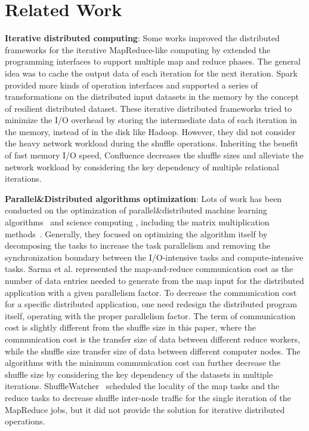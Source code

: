 \documentclass[10pt,journal,compsoc]{IEEEtran}
\begin{document}
\section{Related Work}\label{section:relatedWork}
\textbf{Iterative distributed computing}: 
Some works \cite{gunarathne2013scalable, bu2010haloop, ekanayake2010twister} improved the distributed frameworks for the iterative MapReduce-like computing by extended the programming interfaces to support multiple map and reduce phases. 
The general idea was to cache the output data of each iteration for the next iteration. 
Spark \cite{zaharia2012resilient} provided more kinds of operation interfaces and supported a series of transformations on the distributed input datasets in the memory by the concept of resilient distributed dataset. 
These iterative distributed frameworks tried to minimize the I/O overhead by storing the intermediate data of each iteration in the memory, instead of in the disk like Hadoop. 
However, they did not consider the heavy network workload during the shuffle operations. 
Inheriting the benefit of fast memory I/O speed, Confluence decreases the shuffle sizes and alleviate the network workload by considering the key dependency of multiple relational iterations. 

\textbf{Parallel\&Distributed algorithms optimization}: Lots of work has been conducted on the optimization of parallel\&distributed machine learning algorithms~\cite{bekkerman2011scaling} and science computing \cite{kiran2013verification, mensink2012metric}, including the matrix multiplication methods~\cite{buluc2012parallel, ballard2012communication}. 
Generally, they focused on optimizing the algorithm itself by decomposing the tasks to increase the task parallelism and removing the synchronization boundary between the I/O-intensive tasks and compute-intensive tasks. 
Sarma et al. \cite{Sarma:2013:ULB} represented the map-and-reduce communication cost as the number of data entries needed to generate from the map input for the distributed application with a given parallelism factor. 
To decrease the communication cost for a specific distributed application, one need redesign the distributed program itself, operating with the proper parallelism factor. 
The term of communication cost is slightly different from the shuffle size in this paper, where the communication cost is the transfer size of data between different reduce workers, while the shuffle size transfer size of data between different computer nodes. 
The algorithms with the minimum communication cost can further decrease the shuffle size by considering the key dependency of the datasets in multiple iterations. 
ShuffleWatcher~\cite{faraz2014shufflewatcher} scheduled the locality of the map tasks and the reduce tasks to decrease shuffle inter-node traffic for the single 
iteration of the MapReduce jobs, but it did not provide the solution for iterative distributed operations. 
\end{document}
